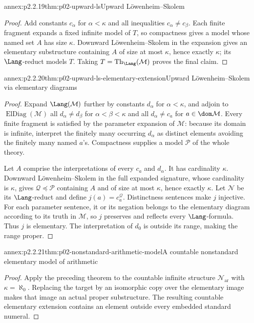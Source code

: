 \begin{annexitem}{annex:p2.2.19}{thm:p02-upward-ls}{Upward L\"owenheim--Skolem}
\begin{proof}
Add constants \(c_\alpha\) for \(\alpha<\kappa\) and all inequalities
\(c_\alpha\ne c_\beta\).  Each finite fragment expands a fixed infinite
model of \(T\), so compactness gives a model whose named set \(A\) has size
\(\kappa\).  Downward L\"owenheim--Skolem in the expansion gives an
elementary substructure containing \(A\) of size at most \(\kappa\), hence
exactly \(\kappa\); its \(\Lang\)-reduct models \(T\).  Taking
\(T=\operatorname{Th}_{\Lang}(\mathcal M)\) proves the final claim.
\end{proof}
\end{annexitem}

\begin{annexitem}{annex:p2.2.20}{thm:p02-upward-ls-elementary-extension}{Upward L\"owenheim--Skolem via elementary diagrams}
\begin{proof}
Expand \(\Lang(\mathcal M)\) further by constants
\(d_\alpha\) for \(\alpha<\kappa\), and adjoin to
\(\operatorname{ElDiag}(\mathcal M)\) all
\(d_\alpha\ne d_\beta\) for \(\alpha<\beta<\kappa\) and all
\(d_\alpha\ne c_a\) for \(a\in\dom\mathcal M\).  Every finite fragment is
satisfied by the parameter expansion of \(\mathcal M\): because its domain
is infinite, interpret the finitely many occurring \(d_\alpha\) as distinct
elements avoiding the finitely many named \(a\)'s.  Compactness supplies a
model \(\mathcal P\) of the whole theory.

Let \(A\) comprise the interpretations of every \(c_a\) and
\(d_\alpha\).  It has cardinality \(\kappa\).  Downward
L\"owenheim--Skolem in the full expanded signature, whose cardinality is
\(\kappa\), gives
\(\mathcal Q\preccurlyeq\mathcal P\) containing \(A\) and of size at most
\(\kappa\), hence exactly \(\kappa\).  Let \(\mathcal N\) be its
\(\Lang\)-reduct and define \(j(a)=c_a^{\mathcal Q}\).  Distinctness
sentences make \(j\) injective.  For each parameter sentence, it or its
negation belongs to the elementary diagram according to its truth in
\(\mathcal M\), so \(j\) preserves and reflects every \(\Lang\)-formula.
Thus \(j\) is elementary.  The interpretation of
\(d_0\) is outside its range, making the range proper.
\end{proof}
\end{annexitem}

\begin{annexitem}{annex:p2.2.21}{thm:p02-nonstandard-arithmetic-model}{A countable nonstandard elementary model of arithmetic}
\begin{proof}
Apply the preceding theorem to the countable infinite structure
\(\mathcal N_{\mathrm{ar}}\) with \(\kappa=\aleph_0\).  Replacing the target
by an isomorphic copy over the elementary image makes that image an actual
proper substructure.  The resulting countable elementary extension contains
an element outside every embedded standard numeral.
\end{proof}
\end{annexitem}
